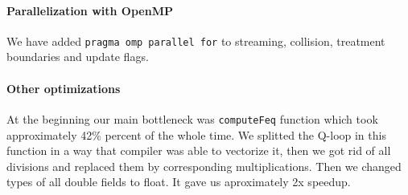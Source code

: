 \documentclass{article}
\begin{document}
\paragraph{Parallelization with
OpenMP}\label{parallelization-with-openmp}

We have added \texttt{pragma\ omp\ parallel\ for} to streaming,
collision, treatment boundaries and update flags.

\paragraph{Other optimizations}\label{other-optimizations}

At the beginning our main bottleneck was \texttt{computeFeq} function
which took approximately 42\% percent of the whole time. We splitted the
Q-loop in this function in a way that compiler was able to vectorize it,
then we got rid of all divisions and replaced them by corresponding
multiplications. Then we changed types of all double fields to float. It
gave us aproximately 2x speedup.
\end{document}
